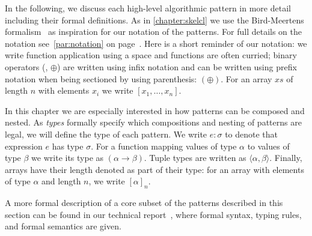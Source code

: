 In the following, we discuss each high-level algorithmic pattern in more detail including their formal definitions.
As in \autoref{chapter:skelcl} we use the Bird-Meertens formalism~\cite{Bird88} as inspiration for our notation of the patterns.
For full details on the notation see~\autoref{par:notation} on page~\pageref{par:notation}.
Here is a short reminder of our notation:
we write function application using a space and functions are often curried;
binary operators (\eg, $\oplus$) are written using infix notation and can be written using prefix notation when being sectioned by using parenthesis: $(\oplus)$.
For an array $xs$ of length $n$ with elements $x_i$ we write $[x_1, \ldots, x_n]$.

In this chapter we are especially interested in how patterns can be composed and nested.
As \emph{types} formally specify which compositions and nesting of patterns are legal, we will define the type of each pattern.
We write $e : \sigma$ to denote that expression $e$ has type $\sigma$.
For a function mapping values of type $\alpha$ to values of type $\beta$ we write its type as $(\alpha \rightarrow \beta)$.
Tuple types are written as $\langle\alpha, \beta\rangle$.
Finally, arrays have their length denoted as part of their type:
for an array with elements of type $\alpha$ and length $n$, we write $[\alpha]_n$.

A more formal description of a core subset of the patterns described in this section can be found in our technical report~\cite{SteuwerFeLiDu2015}, where formal syntax, typing rules, and formal semantics are given.

